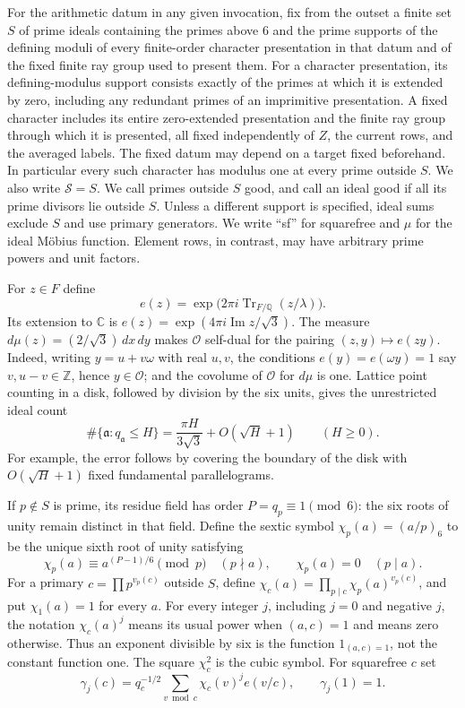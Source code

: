 \documentclass[11pt,a4paper]{article}
\numberwithin{equation}{section}
\numberwithin{figure}{section}
\theoremstyle{definition}
\theoremstyle{remark}
\begin{document}
For the arithmetic datum in any given invocation, fix from the outset a
finite set $S$ of prime ideals containing the primes above $6$ and the prime
supports of the defining moduli of every finite-order character presentation
in that datum and of the fixed finite ray group used to present them.  For a
character presentation, its defining-modulus support consists exactly of the
primes at which it is extended by zero, including any redundant primes of an
imprimitive presentation.  A fixed character includes its entire zero-extended
presentation and the finite ray group through which it is presented, all
fixed independently of $Z$, the current rows, and the averaged labels.  The
fixed datum may depend on a target fixed beforehand.  In particular every
such character has modulus one at every prime outside $S$.  We also write
$\mathcal S=S$.  We call primes outside $S$ good, and call an ideal good if
all its prime divisors lie outside $S$.  Unless a different support is
specified, ideal sums exclude $S$ and use primary generators.  We write
``sf'' for squarefree and $\mu$ for the ideal M\"obius function.  Element rows,
in contrast, may have arbitrary
prime powers and unit factors.

For $z\in F$ define
\[
 e(z)=\exp\bigl(2\pi i\operatorname{Tr}_{F/\mathbb Q}(z/\lambda)\bigr).
\]
Its extension to $\mathbb C$ is
$e(z)=\exp(4\pi i\operatorname{Im}z/\sqrt3)$.  The measure
$d\mu(z)=(2/\sqrt3)\,dx\,dy$ makes $\mathcal O$ self-dual for the pairing
$(z,y)\mapsto e(zy)$.  Indeed, writing $y=u+v\omega$ with real $u,v$, the
conditions $e(y)=e(\omega y)=1$ say $v,u-v\in\mathbb Z$, hence
$y\in\mathcal O$; and the covolume of $\mathcal O$ for $d\mu$ is one.  Lattice point counting
in a disk, followed by division by the six units, gives the unrestricted
ideal count
\[
 \#\{\mathfrak a:q_{\mathfrak a}\le H\}
 =\frac{\pi H}{3\sqrt3}+O(\sqrt H+1)\qquad(H\ge0).
\]
For example, the error follows by covering the boundary of the disk with
$O(\sqrt H+1)$ fixed fundamental parallelograms.

If $p\notin S$ is prime, its residue field has order $P=q_p\equiv1\pmod6$:
the six roots of unity remain distinct in that field.  Define the sextic
symbol $\chi_p(a)=(a/p)_6$ to be the unique sixth root of unity satisfying
\[
 \chi_p(a)\equiv a^{(P-1)/6}\pmod p\quad(p\nmid a),
 \qquad \chi_p(a)=0\quad(p\mid a).
\]
For a primary $c=\prod p^{v_p(c)}$ outside $S$, define
$\chi_c(a)=\prod_{p\mid c}\chi_p(a)^{v_p(c)}$, and put $\chi_1(a)=1$ for
every $a$.  For every integer $j$, including $j=0$ and negative $j$, the
notation $\chi_c(a)^j$ means its usual power when $(a,c)=1$ and means zero
otherwise.  Thus an exponent divisible by six is the function
$1_{(a,c)=1}$, not the constant function one.  The square $\chi_c^2$ is the
cubic symbol.  For squarefree $c$ set
\[
 \gamma_j(c)=q_c^{-1/2}\sum_{v\bmod c}\chi_c(v)^j e(v/c),
 \qquad \gamma_j(1)=1.
\]
\end{document}
